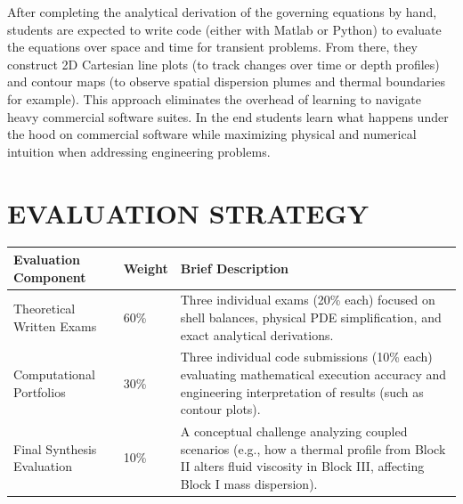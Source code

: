 After completing the analytical derivation of the governing equations by hand, students are expected to write code (either with Matlab or Python) to evaluate the equations over space and time for transient problems. From there, they construct {2D Cartesian line plots} (to track changes over time or depth profiles) and {contour maps} (to observe spatial dispersion plumes and thermal boundaries for example). This approach eliminates the overhead of learning to navigate heavy commercial software suites. In the end students learn what happens under the hood on commercial software while maximizing physical and numerical intuition when addressing engineering problems.

\section{EVALUATION STRATEGY}
\begin{table}[H]
\centering
\small
\begin{tabular}{llp{8cm}}
\toprule
\textbf{Evaluation Component} & \textbf{Weight} & \textbf{Brief Description} \\
\midrule
Theoretical Written Exams & 60\% & Three individual exams (20\% each) focused on shell balances, physical PDE simplification, and exact analytical derivations. \\
\addlinespace
	Computational Portfolios & 30\% & Three individual code submissions (10\% each) evaluating mathematical execution accuracy and engineering interpretation of results (such as contour plots). \\
\addlinespace
Final Synthesis Evaluation & 10\% & A conceptual challenge analyzing coupled scenarios (e.g., how a thermal profile from Block II alters fluid viscosity in Block III, affecting Block I mass dispersion). \\
\bottomrule
\end{tabular}
\end{table}
